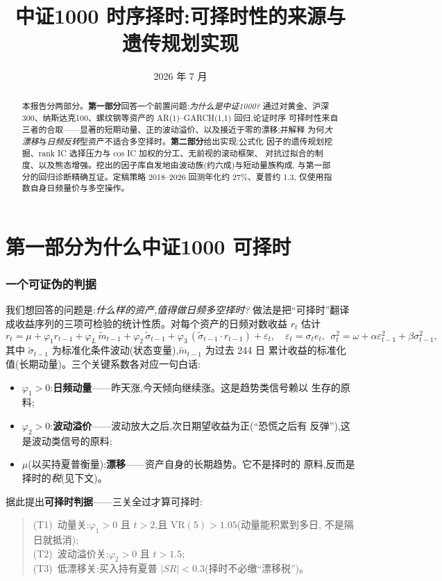 \documentclass[11pt,a4paper,fontset=mac]{ctexart}
\title{\textbf{中证1000 时序择时:可择时性的来源与遗传规划实现}}
\author{}
\date{2026 年 7 月}
\begin{document}
\maketitle
\vspace{-2.2em}
\begin{abstract}
\noindent 本报告分两部分。\textbf{第一部分}回答一个前置问题:\emph{为什么是中证1000?}
通过对黄金、沪深300、纳斯达克100、螺纹钢等资产的 AR(1)--GARCH(1,1) 回归,论证时序
可择时性来自三者的合取——显著的短期动量、正的波动溢价、以及接近于零的漂移;并解释
为何\emph{大漂移}与\emph{日频反转}型资产不适合多空择时。\textbf{第二部分}给出实现:公式化
因子的遗传规划挖掘、rank IC 选择压力与 cos IC 加权的分工、无前视的滚动框架、
对抗过拟合的制度、以及熊态增强。挖出的因子库自发地由波动族(约六成)与短动量族构成,
与第一部分的回归诊断精确互证。定稿策略 2018--2026 回测年化约 27\%、夏普约 1.3,
仅使用指数自身日频量价与多空操作。
\end{abstract}

\part*{第一部分\quad 为什么中证1000 可择时}

\section{一个可证伪的判据}
我们想回答的问题是:\emph{什么样的资产,值得做日频多空择时?}
做法是把``可择时''翻译成收益序列的三项可检验的统计性质。对每个资产的日频对数收益
$r_t$ 估计
\begin{equation}
r_t=\mu+\varphi_1 r_{t-1}+\varphi_L\,\tilde m_{t-1}
     +\varphi_2\,\tilde\sigma_{t-1}+\varphi_3\,(\tilde\sigma_{t-1}\!\cdot\! r_{t-1})+\varepsilon_t,
\quad \varepsilon_t=\sigma_t e_t,\ \ \sigma_t^2=\omega+\alpha\varepsilon_{t-1}^2+\beta\sigma_{t-1}^2,
\end{equation}
其中 $\tilde\sigma_{t-1}$ 为标准化条件波动(状态变量),$\tilde m_{t-1}$ 为过去 244 日
累计收益的标准化值(长期动量)。三个关键系数各对应一句白话:
\begin{itemize}
\item $\varphi_1>0$:\textbf{日频动量}——昨天涨,今天倾向继续涨。这是趋势类信号赖以
生存的原料;
\item $\varphi_2>0$:\textbf{波动溢价}——波动放大之后,次日期望收益为正(``恐慌之后有
反弹''),这是波动类信号的原料;
\item $\mu$(以买持夏普衡量):\textbf{漂移}——资产自身的长期趋势。它不是择时的
原料,反而是择时的\emph{税}(见下文)。
\end{itemize}
据此提出\textbf{可择时判据}——三关全过才算可择时:
\begin{quote}
(T1)~动量关:$\varphi_1>0$ 且 $t>2$,且 $\mathrm{VR}(5)>1.05$(动量能积累到多日,
不是隔日就抵消);\\
(T2)~波动溢价关:$\varphi_2>0$ 且 $t>1.5$;\\
(T3)~低漂移关:买入持有夏普 $|SR|<0.3$(择时不必缴``漂移税'')。
\end{quote}
\end{document}
